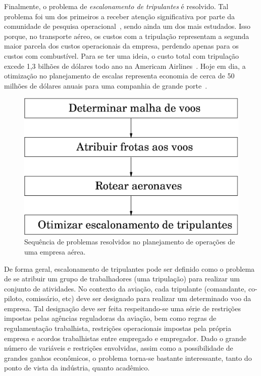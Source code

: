 \documentclass[12pt,a4paper]{article}
\begin{document}
Finalmente, o problema de \emph{escalonamento de tripulantes} é resolvido. Tal problema foi um dos
primeiros a receber atenção significativa por parte da comunidade de pesquisa
operacional~\cite{arabeyre69}, sendo ainda um dos mais estudados. Isso porque, no transporte aéreo,
os custos com a tripulação representam a segunda maior parcela dos custos operacionais da empresa,
perdendo apenas para os custos com combustível. Para se ter uma ideia, o custo total com tripulação
excede 1,3 bilhões de dólares todo ano na Americam Airlines~\cite{anbil91a}. Hoje em dia, a
otimização no planejamento de escalas representa economia de cerca de 50 milhões de dólares anuais
para uma companhia de grande porte~\cite{barnhart03}.

\begin{figure}[htbp]
	\begin{center}
		\includegraphics[scale=0.5]{fig/planejamento.eps}
		\caption{Sequência de problemas resolvidos no planejamento de operações de uma empresa aérea.}
		\label{fig:planejamento}
	\end{center}
\end{figure}

De forma geral, escalonamento de tripulantes pode ser definido como o problema de se atribuir um
grupo de trabalhadores (uma tripulação) para realizar um conjunto de atividades. No contexto da
aviação, cada tripulante (comandante, co-piloto, comissário, etc) deve ser designado para realizar
um determinado voo da empresa. Tal designação deve ser feita respeitando-se uma série de restrições
impostas pelas agências reguladoras da aviação, bem como regras de regulamentação trabalhista,
restrições operacionais impostas pela própria empresa e acordos trabalhistas entre empregado e
empregador. Dado o grande número de variáveis e restrições envolvidas, assim como a possibilidade de
grandes ganhos econômicos, o problema torna-se bastante interessante, tanto do ponto de vista da
indústria, quanto acadêmico.
\end{document}
